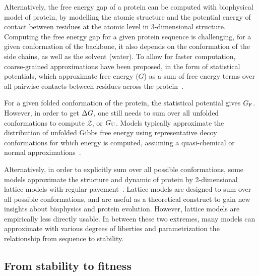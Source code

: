 Alternatively, the free energy gap of a protein can be computed with biophysical model of protein, by modelling the atomic structure and the potential energy of contact between residues at the atomic level in 3-dimensional structure.
Computing the free energy gap for a given protein sequence is challenging, for a given conformation of the backbone, it also depends on the conformation of the side chains, as well as the solvent (water).
To allow for faster computation, coarse-grained approximations have been proposed, in the form of statistical potentials, which approximate free energy ($G$) as a sum of free energy terms over all pairwise contacts between residues across the protein~\citep{Miyazawa1985}.

For a given folded conformation of the protein, the statistical potential gives $G_{\textrm{F}}$.
However, in order to get $\Delta G$, one still needs to sum over all unfolded conformations to compute $\mathcal{Z}$, or $G_{\textrm{U}}$.
Models typically approximate the distribution of unfolded Gibbs free energy using representative decoy conformations for which energy is computed, assuming a quasi-chemical or normal approximations~\citep{Goldstein2011}.

Alternatively, in order to explicitly sum over all possible conformations, some models approximate the structure and dynamic of protein by 2-dimensional lattice models with regular pavement~\citep{Taverna2002, Noivirt-Brik2009}.
Lattice models are designed to sum over all possible conformations, and are useful as a theoretical construct to gain new insights about biophysics and protein evolution.
However, lattice models are empirically less directly usable.
In between these two extremes, many models can approximate with various degrees of liberties and parametrization the relationship from sequence to stability.


\subsection{From stability to fitness}

